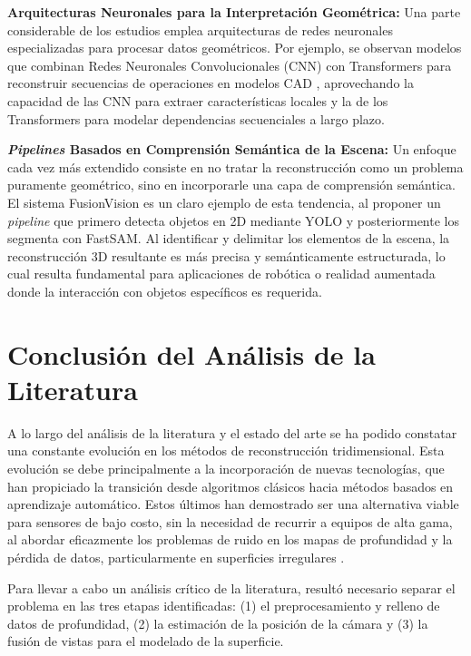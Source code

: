 \documentclass[12pt, a4, twoside, openany]{report}
\begin{document}
\textbf{Arquitecturas Neuronales para la Interpretación Geométrica:} Una parte considerable de los estudios emplea arquitecturas de redes neuronales especializadas para procesar datos geométricos. Por ejemplo, se observan modelos que combinan Redes Neuronales Convolucionales (CNN) con Transformers para reconstruir secuencias de operaciones en modelos CAD \cite{app15126681}, aprovechando la capacidad de las CNN para extraer características locales y la de los Transformers para modelar dependencias secuenciales a largo plazo.

\textbf{\textit{Pipelines} Basados en Comprensión Semántica de la Escena:} Un enfoque cada vez más extendido consiste en no tratar la reconstrucción como un problema puramente geométrico, sino en incorporarle una capa de comprensión semántica. El sistema FusionVision \cite{el2024fusionvision} es un claro ejemplo de esta tendencia, al proponer un \textit{pipeline} que primero detecta objetos en 2D mediante YOLO y posteriormente los segmenta con FastSAM. Al identificar y delimitar los elementos de la escena, la reconstrucción 3D resultante es más precisa y semánticamente estructurada, lo cual resulta fundamental para aplicaciones de robótica o realidad aumentada donde la interacción con objetos específicos es requerida.

\section{Conclusión del Análisis de la Literatura}

A lo largo del análisis de la literatura y el estado del arte se ha podido constatar una constante evolución en los métodos de reconstrucción tridimensional. Esta evolución se debe principalmente a la incorporación de nuevas tecnologías, que han propiciado la transición desde algoritmos clásicos hacia métodos basados en aprendizaje automático. Estos últimos han demostrado ser una alternativa viable para sensores de bajo costo, sin la necesidad de recurrir a equipos de alta gama, al abordar eficazmente los problemas de ruido en los mapas de profundidad y la pérdida de datos, particularmente en superficies irregulares \cite{afzal2025improving}.

Para llevar a cabo un análisis crítico de la literatura, resultó necesario separar el problema en las tres etapas identificadas: (1) el preprocesamiento y relleno de datos de profundidad, (2) la estimación de la posición de la cámara y (3) la fusión de vistas para el modelado de la superficie.
\end{document}
